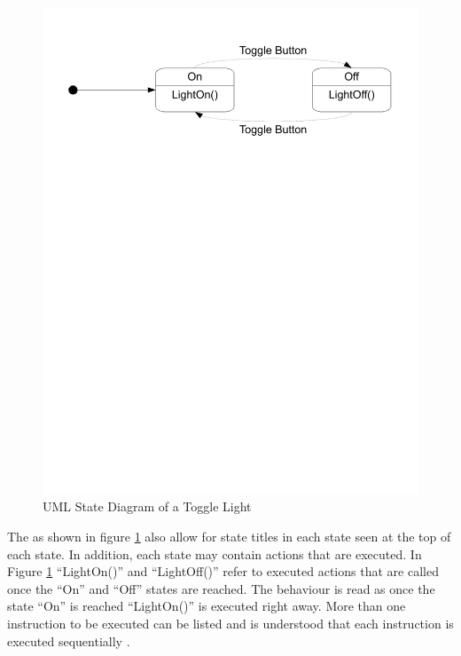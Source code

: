 \begin{figure}[htp]
    \centering
    \includegraphics[trim= 15mm 200mm 15mm 10mm, clip, width=\imgmedium]{./images/state_uml_light.pdf} 
    \caption{UML State Diagram of a Toggle Light}
    \label{fig:state_uml_light}
\end{figure}

The  \cite{UML2} as shown in figure \ref{fig:state_uml_light} also allow for state titles in each state seen at the top of each state. In addition, each state may contain actions that are executed. In Figure \ref{fig:state_uml_light} ``LightOn()'' and ``LightOff()'' refer to executed actions that are called once the ``On'' and ``Off'' states are reached. The behaviour is read as once the state ``On'' is reached ``LightOn()'' is executed right away. More than one instruction to be executed can be listed and is understood that each instruction is executed sequentially \cite{UML2}.

